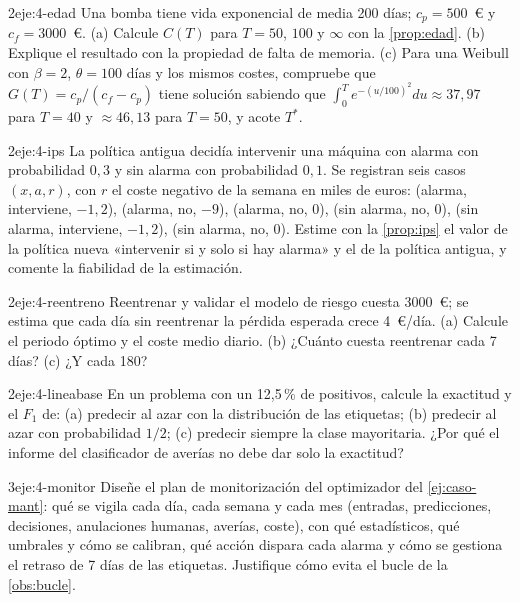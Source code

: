 \begin{ejercicio}{2}{eje:4-edad}
Una bomba tiene vida exponencial de media 200 días; $c_p=500$~€ y $c_f=3000$~€. (a) Calcule $C(T)$ para $T=50$, $100$ y $\infty$ con la \cref{prop:edad}. (b) Explique el resultado con la propiedad de falta de memoria. (c) Para una Weibull con $\beta=2$, $\theta=100$ días y los mismos costes, compruebe que $G(T)=c_p/(c_f-c_p)$ tiene solución sabiendo que $\int_0^{T}e^{-(u/100)^2}du\approx 37{,}97$ para $T=40$ y $\approx 46{,}13$ para $T=50$, y acote $T^{*}$.
\end{ejercicio}

\begin{ejercicio}{2}{eje:4-ips}
La política antigua decidía intervenir una máquina con alarma con probabilidad $0{,}3$ y sin alarma con probabilidad $0{,}1$. Se registran seis casos $(x,a,r)$, con $r$ el coste negativo de la semana en miles de euros: (alarma, interviene, $-1{,}2$), (alarma, no, $-9$), (alarma, no, $0$), (sin alarma, no, $0$), (sin alarma, interviene, $-1{,}2$), (sin alarma, no, $0$). Estime con la \cref{prop:ips} el valor de la política nueva «intervenir si y solo si hay alarma» y el de la política antigua, y comente la fiabilidad de la estimación.
\end{ejercicio}

\begin{ejercicio}{2}{eje:4-reentreno}
Reentrenar y validar el modelo de riesgo cuesta 3000~€; se estima que cada día sin reentrenar la pérdida esperada crece 4~€/día. (a) Calcule el periodo óptimo y el coste medio diario. (b) ¿Cuánto cuesta reentrenar cada 7 días? (c) ¿Y cada 180?
\end{ejercicio}

\begin{ejercicio}{2}{eje:4-lineabase}
En un problema con un 12{,}5\,\% de positivos, calcule la exactitud y el $F_1$ de: (a) predecir al azar con la distribución de las etiquetas; (b) predecir al azar con probabilidad $1/2$; (c) predecir siempre la clase mayoritaria. ¿Por qué el informe del clasificador de averías no debe dar solo la exactitud?
\end{ejercicio}

\begin{ejercicio}{3}{eje:4-monitor}
Diseñe el plan de monitorización del optimizador del \cref{ej:caso-mant}: qué se vigila cada día, cada semana y cada mes (entradas, predicciones, decisiones, anulaciones humanas, averías, coste), con qué estadísticos, qué umbrales y cómo se calibran, qué acción dispara cada alarma y cómo se gestiona el retraso de 7 días de las etiquetas. Justifique cómo evita el bucle de la \cref{obs:bucle}.
\end{ejercicio}
